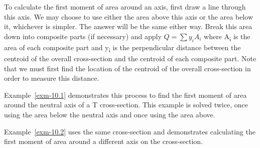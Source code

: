 \documentclass[
  letterpaper,
  DIV=11,
  numbers=noendperiod]{scrreprt}
\theoremstyle{definition}
\theoremstyle{remark}
\begin{document}
To calculate the first moment of area around an axis, first draw a line
through this axis. We may choose to use either the area above this axis
or the area below it, whichever is simpler. The answer will be the same
either way. Break this area down into composite parts (if necessary) and
apply \(Q=\sum y_i A_i\) where A\textsubscript{i} is the area of each
composite part and y\textsubscript{i} is the perpendicular distance
between the centroid of the overall cross-section and the centroid of
each composite part. Note that we must first find the location of the
centroid of the overall cross-section in order to measure this distance.

Example~\ref{exm-10.1} demonstrates this process to find the first
moment of area around the neutral axis of a T cross-section. This
example is solved twice, once using the area below the neutral axis and
once using the area above.

Example~\ref{exm-10.2} uses the same cross-section and demonstrates
calculating the first moment of area around a different axis on the
cross-section.
\end{document}
